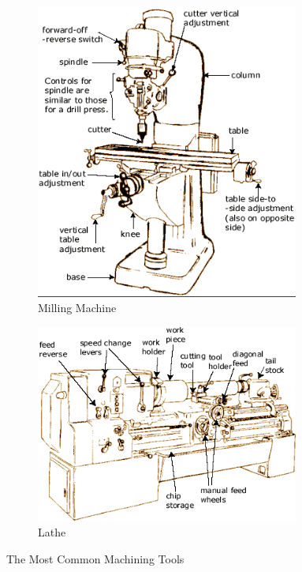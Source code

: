 \documentclass[10pt,letterpaper]{book}
\begin{document}
\begin{figure}[H]
\begin{subfigure}[b]{.34\linewidth}
		\includegraphics[width=0.95\textwidth]{imgs/mill.png}
		\caption{Milling Machine}
	\end{subfigure}	\begin{subfigure}[b]{.4\linewidth}
		\includegraphics[width=0.95\textwidth]{imgs/lathe.png}
		\caption{Lathe}
	\end{subfigure}	
	
	\caption{The Most Common Machining Tools}
\end{figure}
\end{document}
